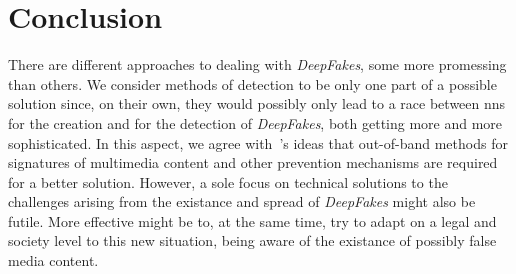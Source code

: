 \section{Conclusion}
There are different approaches to dealing with \textit{DeepFakes}, some more
promessing than others.
We consider methods of detection to be only one part of a possible solution since,
on their own, they would possibly only lead to a race between \glspl{nn} for
the creation and for the detection of \textit{DeepFakes}, both getting more and
more sophisticated. In this aspect, we agree with~\textcite{mirsky_creation_2020}'s ideas that 
out-of-band methods for signatures of multimedia content and other prevention
mechanisms are required for a better solution.
However, a sole focus on technical solutions to the challenges arising from the 
existance and spread of \textit{DeepFakes} might also be futile. More effective
might be to, at the same time, try to adapt on a legal and society level to this
new situation, being aware of the existance of possibly false media content.
